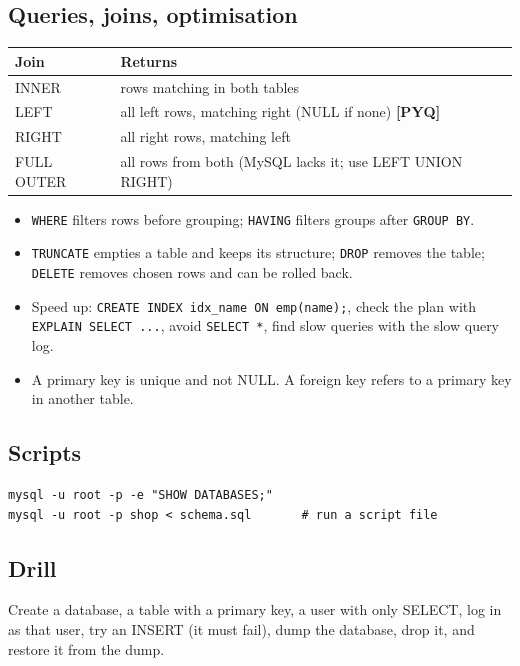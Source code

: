 \documentclass[11pt,a4paper]{article}
\newcommand{\pyq}{\textcolor{ember}{\scriptsize\textbf{[PYQ]}}}
\begin{document}
\subsection{Queries, joins, optimisation}
\begin{center}\small\renewcommand{\arraystretch}{1.18}\setlength{\tabcolsep}{9pt}
\begin{tabularx}{\linewidth}{@{}l>{\raggedright\arraybackslash}X@{}}
\toprule
\textbf{\color{slate}Join} & \textbf{\color{slate}Returns} \\ \midrule
INNER & rows matching in both tables \\
LEFT & all left rows, matching right (NULL if none) \pyq{} \\
RIGHT & all right rows, matching left \\
FULL OUTER & all rows from both (MySQL lacks it; use LEFT UNION RIGHT) \\
\bottomrule
\end{tabularx}\end{center}
\begin{itemize}
\item \texttt{WHERE} filters rows before grouping; \texttt{HAVING} filters groups after \texttt{GROUP BY}.
\item \texttt{TRUNCATE} empties a table and keeps its structure; \texttt{DROP} removes the table; \texttt{DELETE} removes chosen rows and can be rolled back.
\item Speed up: \texttt{CREATE INDEX idx\_name ON emp(name);}, check the plan with \texttt{EXPLAIN SELECT ...}, avoid \texttt{SELECT *}, find slow queries with the slow query log.
\item A primary key is unique and not NULL. A foreign key refers to a primary key in another table.
\end{itemize}
\subsection{Scripts}
\begin{lstlisting}
mysql -u root -p -e "SHOW DATABASES;"
mysql -u root -p shop < schema.sql       # run a script file
\end{lstlisting}
\subsection*{Drill}
Create a database, a table with a primary key, a user with only SELECT, log in as that user, try an INSERT (it must fail), dump the database, drop it, and restore it from the dump.
\end{document}
